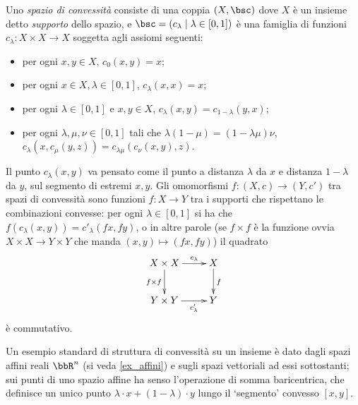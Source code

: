\begin{example}\label{ex_cat_conv}
 Uno \emph{spazio di convessità} consiste di una coppia \((X,\bsc)\) dove \(X\) è un insieme detto \emph{supporto} dello spazio, e \(\bsc=(c_\lambda\mid \lambda\in[0,1])\) è una famiglia di funzioni \(c_\lambda \colon X\times X\to X\)	soggetta agli assiomi seguenti:
 \begin{itemize}
  \item per ogni \(x,y\in X\), \(c_0(x,y) = x\);
  \item per ogni \(x\in X,\lambda \in [0,1]\), \(c_\lambda(x,x) = x\);
  \item per ogni \(\lambda \in [0,1]\) e \(x,y\in X\), \(c_\lambda(x,y) = c_{1-\lambda}(y,x)\);
  \item per ogni \(\lambda,\mu,\nu \in [0,1]\) tali che \(\lambda(1 - \mu) = (1 - \lambda\mu)\nu\), \(c_\lambda(x, c_\mu(y,z)) = c_{\lambda\mu}(c_\nu(x,y),z)\).
 \end{itemize}
 Il punto \(c_\lambda(x,y)\) va pensato come il punto a distanza \(\lambda\) da \(x\) e distanza \(1-\lambda\) da \(y\), sul segmento di estremi \(x,y\). Gli omomorfismi \(f \colon (X,c) \to (Y,c')\) tra spazi di convessità sono funzioni \(f \colon X\to Y\) tra i supporti che rispettano le combinazioni convesse: per ogni \(\lambda \in [0,1]\) si ha che \(f(c_\lambda(x,y)) = c'_\lambda(fx, fy)\), o in altre parole (se \(f\times f\) è la funzione ovvia \(X\times X\to Y\times Y\) che manda \((x,y)\mapsto (fx,fy)\)) il quadrato
 \[\xymatrix{
  X \times X \ar[r]^-{c_\lambda}\ar[d]_{f\times f} & X \ar[d]^f\\
  Y \times Y \ar[r]_-{c'_\lambda} & Y
  }\]
 è commutativo.
\end{example}
Un esempio standard di struttura di convessità su un insieme è dato dagli spazi affini reali \(\bbR^n\) (si veda \ref{ex_affini}) e sugli spazi vettoriali ad essi sottostanti; sui punti di uno spazio affine ha senso l'operazione di somma baricentrica, che definisce un unico punto \(\lambda\cdot x + (1-\lambda)\cdot y\) lungo il  `segmento' convesso \([x,y]\).
